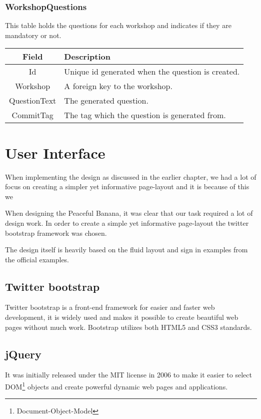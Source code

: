 \subsubsection*{WorkshopQuestions}
This table holds the questions for each workshop and indicates if they are mandatory or not. \\

\vspace{0.5cm}
\begin{tabularx}{\linewidth}{| c | X |}
    \hline
    \rowcolor[gray]{0.8}
    \textbf{Field} & \textbf{Description} \\
    \hline
    Id & Unique id generated when the question is created.\\ \hline
   	Workshop & A foreign key to the workshop.\\ \hline
   	QuestionText & The generated question.\\ \hline
   	CommitTag & The tag which the question is generated from.\\ 
    \hline
\end{tabularx}
\vspace{0.5cm}

\section{User Interface}
When implementing the design as discussed in the earlier chapter, we had a lot of focus on creating a simpler yet informative page-layout and it is because of this we 

When designing the Peaceful Banana, it was clear that our task required a lot of design work. In order to create a simple yet informative page-layout the twitter bootstrap framework was chosen.

The design itself is heavily based on the fluid layout and sign in examples from the official examples.

\subsection{Twitter bootstrap}
Twitter bootstrap is a front-end framework for easier and faster web development, it is widely used and makes it possible to create beautiful web pages without much work. Bootstrap utilizes both HTML5 and CSS3 standards.

\subsection{jQuery}
It was initially released under the MIT license in 2006 to make it easier to select DOM\footnote{Document-Object-Model} objects and create powerful dynamic web pages and applications.

